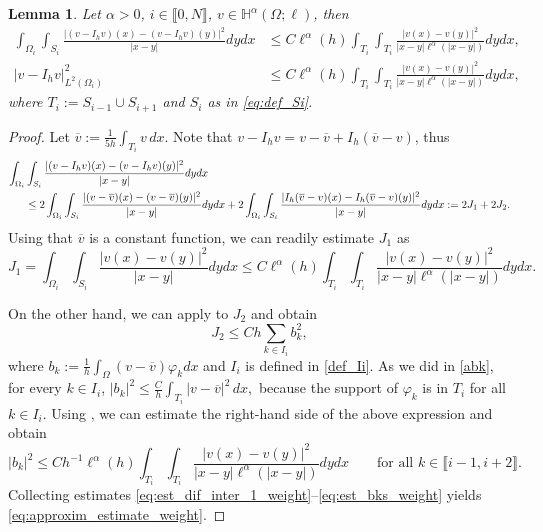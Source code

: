 \documentclass[11 pt]{article}
\newcommand\inter[1]{\llbracket #1\rrbracket}
\newtheorem{lemma}[theorem]{Lemma}
\numberwithin{equation}{section}
\newcommand{\weH}[1]{\mathbb H^{#1}(\Omega;\ell)}
\begin{document}
\begin{lemma}\label{lem:stab_dif_interp_weight}
Let $\alpha>0$, $i\in\inter{0,N}$, $v\in \weH{\alpha}$, then
\begin{align}
    \int_{\Omega_i}\int_{S_i}\frac{|(v-I_h v)(x)-(v-I_h v)(y)|^2}{|x-y|}dy dx &\leq C  \ell^{\alpha}(h)\int_{T_i}\int_{T_{i}}\frac{|v(x)-v(y)|^2}{|x-y|\ell^{\alpha}(|x-y|)}dy dx, \label{eq:approxim_estimate_weight}\\
    |v-I_h v|_{L^2(\Omega_i)}^2&\leq C\ell^{\alpha}(h)\int_{T_{i}}\int_{T_{i}}\frac{|v(x)-v(y)|^2}{|x-y|\ell^{\alpha}(|x-y|)}dy dx,\label{a4}
\end{align}
where $T_i:=S_{i-1}\cup S_{i+1}$ and $S_i$ as in \eqref{eq:def_Si}.
\end{lemma}
%
\begin{proof}
Let $\overline{v}:=\frac{1}{5h}\int_{T_{i}} v\, dx$. Note that $v-I_h v=v-\overline{v}+I_h(\overline v - v)$, thus
%
\begin{align}\notag
    \int_{\Omega_i}&\int_{S_i}\frac{|(v-I_h v)(x)-(v-I_h v)(y)|^2}{|x-y|} dy dx \\
    &\leq 2\int_{\Omega_i}\int_{S_i}\frac{|(v-\overline{v})(x)-(v-\overline{v})(y)|^2}{|x-y|}dy dx + 2 \int_{\Omega_i}\int_{S_i}\frac{|I_h(\overline v-{v})(x)-I_h(\overline v-{v})(y)|^2}{|x-y|}dy dx :=2J_1+2J_2.\label{eq:est_dif_inter_1_weight}
\end{align}
%
Using that $\overline v$ is a constant function, we can readily estimate $J_1$ as
%
\begin{equation}\label{eq:est_J1_weight}
    J_1 = \int_{\Omega_i}\int_{S_i}\frac{|v(x)-v(y)|^2}{|x-y|}dy dx \leq C\ell^{\alpha}(h)\int_{T_i}\int_{T_i}\frac{|v(x)-v(y)|^2}{|x-y|\ell^{\alpha}(|x-y|)}dy dx.
\end{equation}

On the other hand, we can apply  to $J_2$ and obtain
%
\begin{equation}\label{eq:est_J2_weight}
    J_2 \leq Ch\sum_{k\in I_i} b_k^2,
\end{equation}
%
where $b_k:=\frac{1}{h}\int_{\Omega}(v-\overline v)\varphi_k dx$ and $I_i$ is defined in \eqref{def_Ii}. As we did in \eqref{abk}, for every $k\in I_i$, $
    |b_k|^2\leq \frac{C}{h}\int_{T_{i}}|v-\overline{v}|^2\, dx,$ because the support of $\varphi_k$ is in $T_{i}$ for all $k\in I_i$. Using , we can estimate the right-hand side of the above expression and obtain
%
\begin{equation}\label{eq:est_bks_weight}
    |b_k|^2\leq Ch^{-1}\ell^{\alpha}(h)\int_{T_{i}}\int_{T_{i}}\frac{|v(x)-v(y)|^2}{|x-y|\ell^{\alpha}(|x-y|)}dy dx\qquad \text{for all $k\in \inter{i-1,i+2}$}.
\end{equation}
%
Collecting estimates \eqref{eq:est_dif_inter_1_weight}--\eqref{eq:est_bks_weight} yields \eqref{eq:approxim_estimate_weight}. 


\end{proof}
\end{document}

